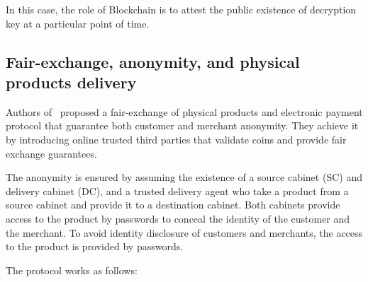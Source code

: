 \documentclass{ieeeaccess}
\begin{document}
In this case, the role of Blockchain is to attest the public existence of decryption key at a particular point of time.

\subsection{Fair-exchange, anonymity, and physical products delivery} 
\label{anonymity-and-fair-exchange-in-e-commerce-protocol-for-physical-products-delivery}

Authors of~\cite{birjoveanu2015anonymity} proposed a
fair-exchange of physical products and electronic payment protocol that
guarantee both customer and merchant anonymity. They achieve it by
introducing online trusted third parties that validate coins and provide
fair exchange guarantees.

The anonymity is ensured by assuming the existence of a source cabinet
(SC) and delivery cabinet (DC), and a trusted delivery agent who take
a product from a source cabinet and provide it to a destination cabinet.
Both cabinets provide access to the product by passwords to conceal
the identity of the customer and the merchant. To avoid identity disclosure
of customers and merchants, the access to the product is provided by
passwords.

The protocol works as follows: \begingroup
\renewcommand{\labelenumii}{\arabic{enumii}.}
\end{document}
